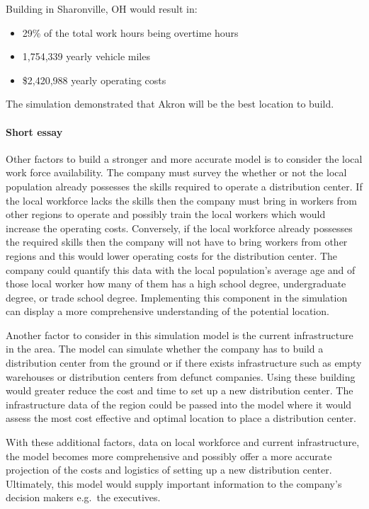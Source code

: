 \documentclass[
  11pt,
]{article}
\let\oldparagraph\paragraph
\renewcommand{\paragraph}[1]{\oldparagraph{#1}\mbox{}}
\begin{document}
Building in Sharonville, OH would result in:

\begin{itemize}
\item
  29\% of the total work hours being overtime hours
\item
  1,754,339 yearly vehicle miles
\item
  \$2,420,988 yearly operating costs
\end{itemize}

The simulation demonstrated that Akron will be the best location to
build.

\paragraph{Short essay}\label{short-essay}

Other factors to build a stronger and more accurate model is to consider
the local work force availability. The company must survey the whether
or not the local population already possesses the skills required to
operate a distribution center. If the local workforce lacks the skills
then the company must bring in workers from other regions to operate and
possibly train the local workers which would increase the operating
costs. Conversely, if the local workforce already possesses the required
skills then the company will not have to bring workers from other
regions and this would lower operating costs for the distribution
center. The company could quantify this data with the local population's
average age and of those local worker how many of them has a high school
degree, undergraduate degree, or trade school degree. Implementing this
component in the simulation can display a more comprehensive
understanding of the potential location.

Another factor to consider in this simulation model is the current
infrastructure in the area. The model can simulate whether the company
has to build a distribution center from the ground or if there exists
infrastructure such as empty warehouses or distribution centers from
defunct companies. Using these building would greater reduce the cost
and time to set up a new distribution center. The infrastructure data of
the region could be passed into the model where it would assess the most
cost effective and optimal location to place a distribution center.

With these additional factors, data on local workforce and current
infrastructure, the model becomes more comprehensive and possibly offer
a more accurate projection of the costs and logistics of setting up a
new distribution center. Ultimately, this model would supply important
information to the company's decision makers e.g.~the executives.
\end{document}
